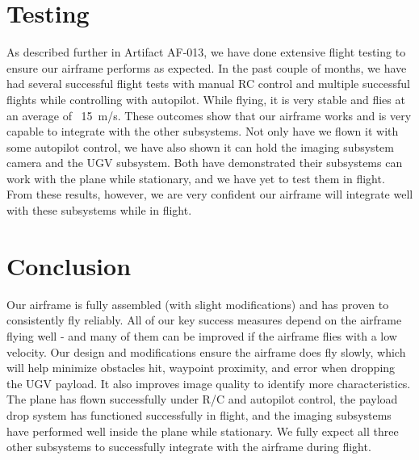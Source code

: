 \documentclass[]{auvsi_doc}
\begin{document}
\section{Testing}
As described further in Artifact AF-013, we have done extensive flight testing to ensure our airframe performs as expected. In the past couple of months, we have had several successful flight tests with manual RC control and multiple successful flights while controlling with autopilot. While flying, it is very stable and flies at an average of ~15\ m/s. These outcomes show that our airframe works and is very capable to integrate with the other subsystems. Not only have we flown it with some autopilot control, we have also shown it can hold the imaging subsystem camera and the UGV subsystem. Both have demonstrated their subsystems can work with the plane while stationary, and we have yet to test them in flight. From these results, however, we are very confident our airframe will integrate well with these subsystems while in flight. 

\section{Conclusion}
Our airframe is fully assembled (with slight modifications) and has proven to consistently fly reliably. All of our key success measures depend on the airframe flying well - and many of them can be improved if the airframe flies with a low velocity. Our design and modifications ensure the airframe does fly slowly, which will help minimize obstacles hit, waypoint proximity, and error when dropping the UGV payload. It also improves image quality to identify more characteristics. The plane has flown successfully under R/C and autopilot control, the payload drop system has functioned successfully in flight, and the imaging subsystems have performed well inside the plane while stationary. We fully expect all three other subsystems to successfully integrate with the airframe during flight.
\end{document}
